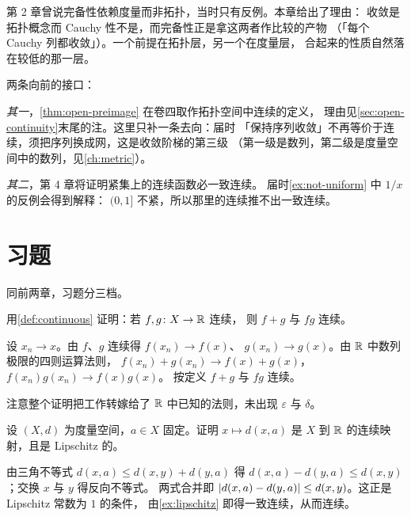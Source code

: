 第 2 章曾说完备性依赖度量而非拓扑，当时只有反例。本章给出了理由：
收敛是拓扑概念而 Cauchy 性不是，而完备性正是拿这两者作比较的产物
（「每个 Cauchy 列都收敛」）。一个前提在拓扑层，另一个在度量层，
合起来的性质自然落在较低的那一层。

两条向前的接口：

\emph{其一}，\cref{thm:open-preimage} 在卷四取作拓扑空间中连续的定义，
理由见\cref{sec:open-continuity}末尾的注。这里只补一条去向：届时
「保持序列收敛」不再等价于连续，须把序列换成网，这是收敛阶梯的第三级
（第一级是数列，第二级是度量空间中的数列，见\cref{ch:metric}）。

\emph{其二}，第 4 章将证明紧集上的连续函数必一致连续。
届时\cref{ex:not-uniform} 中 \(1/x\) 的反例会得到解释：
\((0,1]\) 不紧，所以那里的连续推不出一致连续。

\section*{习题}

同前两章，习题分三档。

\begin{exercise}[例行]
  \label{exr:seq-continuity-basic}
  用\cref{def:continuous} 证明：若 \(f, g \colon X \to \mathbb{R}\) 连续，
  则 \(f+g\) 与 \(fg\) 连续。
  \begin{solution}
    设 \(x_{n} \to x\)。由 \(f\)、\(g\) 连续得 \(f(x_{n}) \to f(x)\)、
    \(g(x_{n}) \to g(x)\)。由 \(\mathbb{R}\) 中数列极限的四则运算法则，
    \(f(x_{n})+g(x_{n}) \to f(x)+g(x)\)，\(f(x_{n})g(x_{n}) \to f(x)g(x)\)。
    按定义 \(f+g\) 与 \(fg\) 连续。

    注意整个证明把工作转嫁给了 \(\mathbb{R}\) 中已知的法则，未出现 \(\varepsilon\) 与 \(\delta\)。
  \end{solution}
\end{exercise}

\begin{exercise}[例行]
  \label{exr:distance-continuous}
  设 \((X,d)\) 为度量空间，\(a \in X\) 固定。证明 \(x \mapsto d(x,a)\)
  是 \(X\) 到 \(\mathbb{R}\) 的连续映射，且是 Lipschitz 的。
  \begin{solution}
    由三角不等式 \(d(x,a) \le d(x,y)+d(y,a)\) 得
    \(d(x,a)-d(y,a) \le d(x,y)\)；交换 \(x\) 与 \(y\) 得反向不等式。
    两式合并即 \(\lvert d(x,a)-d(y,a)\rvert \le d(x,y)\)。这正是 Lipschitz 常数为 \(1\) 的条件，
    由\cref{ex:lipschitz} 即得一致连续，从而连续。
  \end{solution}
\end{exercise}

